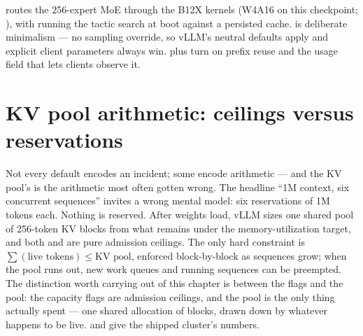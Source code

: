  routes the 256-expert MoE through the
B12X kernels (W4A16 on this checkpoint; ), with
 running the tactic search at boot
against a persisted cache.  is deliberate
minimalism --- no sampling override, so vLLM's neutral defaults apply and
explicit client parameters always win. 
plus  turn on prefix reuse and the
 usage field that lets clients observe it.

\section{KV pool arithmetic: ceilings versus reservations}
\label{sec:profile-kvpool}

Not every default encodes an incident; some encode arithmetic --- and the
KV pool's is the arithmetic most often gotten wrong. The headline ``1M
context, six concurrent sequences'' invites a wrong mental
model: six reservations of 1M tokens each. Nothing is reserved.
After weights load, vLLM sizes one shared pool of 256-token KV blocks from
what remains under the memory-utilization target, and both
 and  are pure admission ceilings. The
only hard constraint is
$\sum(\text{live tokens}) \le \text{KV pool}$, enforced block-by-block as
sequences grow; when the pool runs out, new work queues and running sequences
can be preempted. The distinction worth carrying out of this chapter is
between the flags and the pool: the capacity flags are admission ceilings,
and the pool is the only thing actually spent --- one shared allocation of
blocks, drawn down by whatever happens to be live.  and
 give the shipped cluster's numbers.

